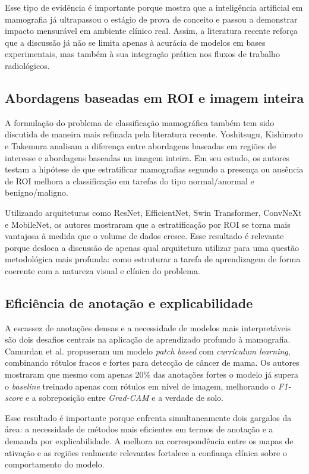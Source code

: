 Esse tipo de evidência é importante porque mostra que a inteligência artificial em mamografia já ultrapassou o estágio de prova de conceito e passou a demonstrar impacto mensurável em ambiente clínico real. Assim, a literatura recente reforça que a discussão já não se limita apenas à acurácia de modelos em bases experimentais, mas também à sua integração prática nos fluxos de trabalho radiológicos.

\subsection{Abordagens baseadas em ROI e imagem inteira}

A formulação do problema de classificação mamográfica também tem sido discutida de maneira mais refinada pela literatura recente. Yoshitsugu, Kishimoto e Takemura \cite{yoshitsugu2026} analisam a diferença entre abordagens baseadas em regiões de interesse e abordagens baseadas na imagem inteira. Em seu estudo, os autores testam a hipótese de que estratificar mamografias segundo a presença ou ausência de ROI melhora a classificação em tarefas do tipo normal/anormal e benigno/maligno.

Utilizando arquiteturas como ResNet, EfficientNet, Swin Transformer, ConvNeXt e MobileNet, os autores mostraram que a estratificação por ROI se torna mais vantajosa à medida que o volume de dados cresce. Esse resultado é relevante porque desloca a discussão de apenas qual arquitetura utilizar para uma questão metodológica mais profunda: como estruturar a tarefa de aprendizagem de forma coerente com a natureza visual e clínica do problema.

\subsection{Eficiência de anotação e explicabilidade}

A escassez de anotações densas e a necessidade de modelos mais interpretáveis são dois desafios centrais na aplicação de aprendizado profundo à mamografia. Camurdan et al. \cite{camurdan2025} propuseram um modelo \textit{patch based} com \textit{curriculum learning}, combinando rótulos fracos e fortes para detecção de câncer de mama. Os autores mostraram que mesmo com apenas 20\% das anotações fortes o modelo já supera o \textit{baseline} treinado apenas com rótulos em nível de imagem, melhorando o \textit{F1-score} e a sobreposição entre \textit{Grad-CAM} e a verdade de solo.

Esse resultado é importante porque enfrenta simultaneamente dois gargalos da área: a necessidade de métodos mais eficientes em termos de anotação e a demanda por explicabilidade. A melhora na correspondência entre os mapas de ativação e as regiões realmente relevantes fortalece a confiança clínica sobre o comportamento do modelo.


